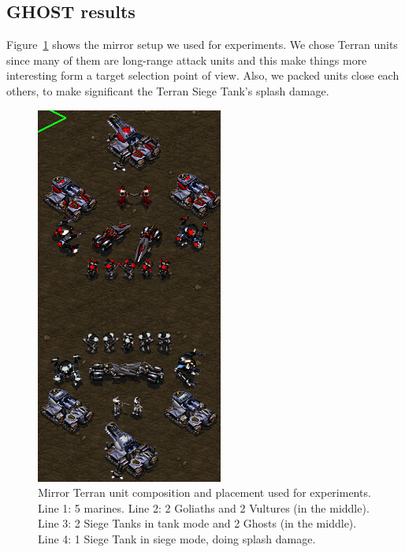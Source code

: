 \documentclass[journal]{IEEEtran}
\newcommand{\ghost}{\textsc{GHOST}\xspace}
\begin{document}
\subsection{\ghost results}

Figure~\ref{fig:target}   shows  the   mirror   setup   we  used   for
experiments. We chose  Terran units since many of  them are long-range
attack  units and  this make  things  more interesting  form a  target
selection point of  view. Also, we packed units close  each others, to
make significant the Terran Siege Tank's splash damage.

\begin{figure}[h!]
  \centering
  \includegraphics[width=0.7\columnwidth]{figs/target_setup.png}
  \caption{Mirror  Terran  unit  composition and  placement  used  for
    experiments. Line 1: 5 marines. Line  2: 2 Goliaths and 2 Vultures
    (in the middle). Line  3: 2 Siege Tanks in tank  mode and 2 Ghosts
    (in the middle). Line 4: 1  Siege Tank in siege mode, doing splash
    damage.}
  \label{fig:target}
\end{figure}
\end{document}

